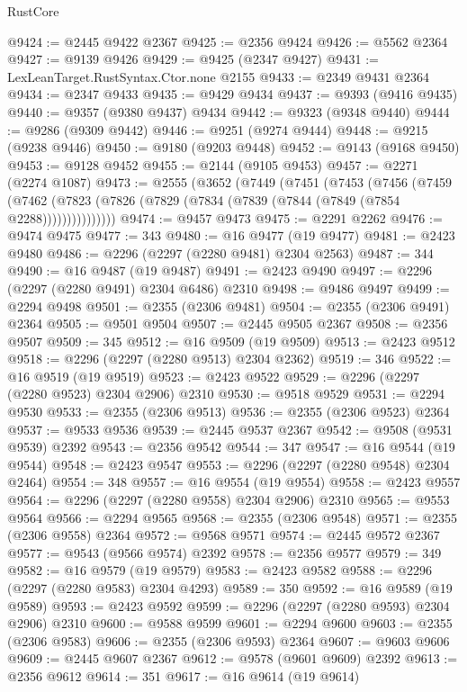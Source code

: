 \begin{lexlean}{RustCore}
\begin{coremodule}
@9424 := @2445 @9422 @2367
@9425 := @2356 @9424
@9426 := @5562 @2364
@9427 := @9139 @9426
@9429 := @9425 (@2347 @9427)
@9431 := LexLeanTarget.RustSyntax.Ctor.none @2155
@9433 := @2349 @9431 @2364
@9434 := @2347 @9433
@9435 := @9429 @9434
@9437 := @9393 (@9416 @9435)
@9440 := @9357 (@9380 @9437) @9434
@9442 := @9323 (@9348 @9440)
@9444 := @9286 (@9309 @9442)
@9446 := @9251 (@9274 @9444)
@9448 := @9215 (@9238 @9446)
@9450 := @9180 (@9203 @9448)
@9452 := @9143 (@9168 @9450)
@9453 := @9128 @9452
@9455 := @2144 (@9105 @9453)
@9457 := @2271 (@2274 @1087)
@9473 := @2555
    (@3652
      (@7449
        (@7451
          (@7453
            (@7456
              (@7459
                (@7462 (@7823 (@7826 (@7829 (@7834 (@7839 (@7844 (@7849 (@7854 @2288)))))))))))))))
@9474 := @9457 @9473
@9475 := @2291 @2262
@9476 := @9474 @9475
@9477 := 343
@9480 := @16 @9477 (@19 @9477)
@9481 := @2423 @9480
@9486 := @2296 (@2297 (@2280 @9481) @2304 @2563)
@9487 := 344
@9490 := @16 @9487 (@19 @9487)
@9491 := @2423 @9490
@9497 := @2296 (@2297 (@2280 @9491) @2304 @6486) @2310
@9498 := @9486 @9497
@9499 := @2294 @9498
@9501 := @2355 (@2306 @9481)
@9504 := @2355 (@2306 @9491) @2364
@9505 := @9501 @9504
@9507 := @2445 @9505 @2367
@9508 := @2356 @9507
@9509 := 345
@9512 := @16 @9509 (@19 @9509)
@9513 := @2423 @9512
@9518 := @2296 (@2297 (@2280 @9513) @2304 @2362)
@9519 := 346
@9522 := @16 @9519 (@19 @9519)
@9523 := @2423 @9522
@9529 := @2296 (@2297 (@2280 @9523) @2304 @2906) @2310
@9530 := @9518 @9529
@9531 := @2294 @9530
@9533 := @2355 (@2306 @9513)
@9536 := @2355 (@2306 @9523) @2364
@9537 := @9533 @9536
@9539 := @2445 @9537 @2367
@9542 := @9508 (@9531 @9539) @2392
@9543 := @2356 @9542
@9544 := 347
@9547 := @16 @9544 (@19 @9544)
@9548 := @2423 @9547
@9553 := @2296 (@2297 (@2280 @9548) @2304 @2464)
@9554 := 348
@9557 := @16 @9554 (@19 @9554)
@9558 := @2423 @9557
@9564 := @2296 (@2297 (@2280 @9558) @2304 @2906) @2310
@9565 := @9553 @9564
@9566 := @2294 @9565
@9568 := @2355 (@2306 @9548)
@9571 := @2355 (@2306 @9558) @2364
@9572 := @9568 @9571
@9574 := @2445 @9572 @2367
@9577 := @9543 (@9566 @9574) @2392
@9578 := @2356 @9577
@9579 := 349
@9582 := @16 @9579 (@19 @9579)
@9583 := @2423 @9582
@9588 := @2296 (@2297 (@2280 @9583) @2304 @4293)
@9589 := 350
@9592 := @16 @9589 (@19 @9589)
@9593 := @2423 @9592
@9599 := @2296 (@2297 (@2280 @9593) @2304 @2906) @2310
@9600 := @9588 @9599
@9601 := @2294 @9600
@9603 := @2355 (@2306 @9583)
@9606 := @2355 (@2306 @9593) @2364
@9607 := @9603 @9606
@9609 := @2445 @9607 @2367
@9612 := @9578 (@9601 @9609) @2392
@9613 := @2356 @9612
@9614 := 351
@9617 := @16 @9614 (@19 @9614)

\end{coremodule}
\end{lexlean}
